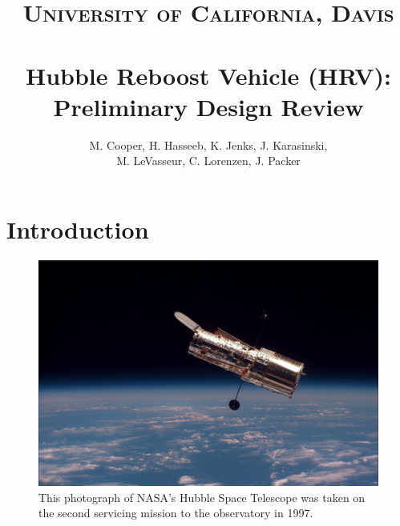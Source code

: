 \documentclass[paper=letter, fontsize=11pt]{scrartcl} %
\title{
\normalfont \normalsize
\textsc{University of California, Davis} \\ [25pt] %
\horrule{2pt} \\[0.4cm] %
\huge Hubble Reboost Vehicle (HRV): \\ Preliminary Design Review %
\horrule{2pt} \\[0.5cm] %
}
\author{
M. Cooper, H. Hasseeb, K. Jenks, J. Karasinski, \\M. LeVasseur, C. Lorenzen, J. Packer} %
\date{} %
\numberwithin{equation}{section} %
\numberwithin{figure}{section} %
\numberwithin{table}{section} %
\begin{document}
\maketitle %
\newpage


\tableofcontents
\newpage



\section{Introduction}

\begin{figure}[tbh]
    \begin{center}
        \includegraphics[width=1\textwidth]{imgs/hst.jpg}
        \caption{This photograph of NASA's Hubble Space Telescope was taken on the second servicing mission to the observatory in 1997.}
    \end{center}
\end{figure}
\end{document}
